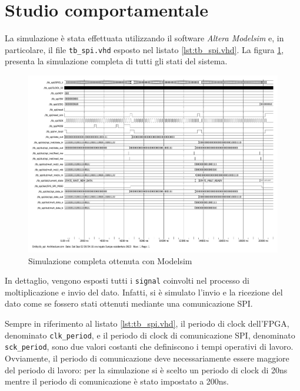 \documentclass[titlepage]{report}
\begin{document}
	\section*{Studio comportamentale}
	\label{sec:studio_comportamentale}
		La simulazione è stata effettuata utilizzando il software \textit{Altera Modelsim} e, in particolare, il file \texttt{tb\_spi.vhd} esposto nel listato \ref{lst:tb_spi.vhd}.
		La figura \ref*{fig:modelsim_sim_completa}, presenta la simulazione completa di tutti gli stati del sistema.

		\begin{figure}[H]
			\centering
			\includegraphics[scale=0.5]{./img/simulation.pdf}
			\caption{Simulazione completa ottenuta con Modelsim}
			\label{fig:modelsim_sim_completa}
		\end{figure}

		In dettaglio, vengono esposti tutti i \texttt{signal} coinvolti nel processo di moltiplicazione e invio del dato. Infatti, si è simulato l'invio e la ricezione del dato come se fossero stati ottenuti mediante una comunicazione SPI.

		Sempre in riferimento al listato \ref*{lst:tb_spi.vhd}, il periodo di clock dell'FPGA, denominato \texttt{clk\_period}, e il periodo di clock di comunicazione SPI, denominato \texttt{sck\_period}, sono due valori costanti che definiscono i tempi operativi di lavoro. Ovviamente, il periodo di comunicazione deve necessariamente essere maggiore del periodo di lavoro: per la simulazione si è scelto un periodo di clock di 20ns mentre il periodo di comunicazione è stato impostato a 200ns.
\end{document}
